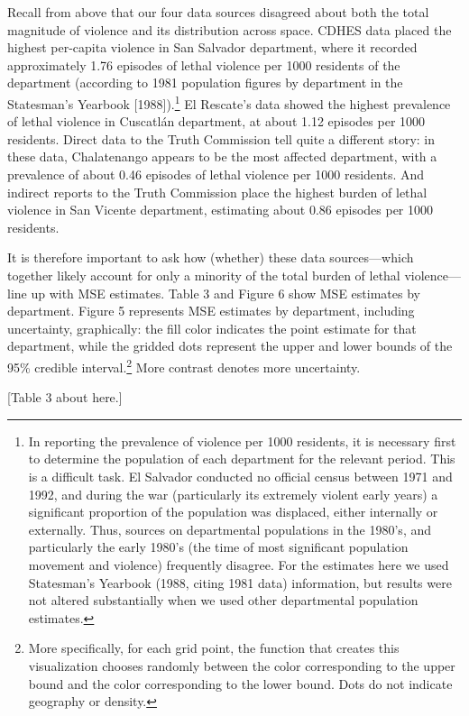 \documentclass[11pt,]{article}
\let\rmarkdownfootnote\footnote%
\def\footnote{\protect\rmarkdownfootnote}
\begin{document}
Recall from above that our four data sources disagreed about both the
total magnitude of violence and its distribution across space. CDHES
data placed the highest per-capita violence in San Salvador department,
where it recorded approximately 1.76 episodes of lethal violence per
1000 residents of the department (according to 1981 population figures
by department in the Statesman's Yearbook {[}1988{]}).\footnote{In
  reporting the prevalence of violence per 1000 residents, it is
  necessary first to determine the population of each department for the
  relevant period. This is a difficult task. El Salvador conducted no
  official census between 1971 and 1992, and during the war
  (particularly its extremely violent early years) a significant
  proportion of the population was displaced, either internally or
  externally. Thus, sources on departmental populations in the 1980's,
  and particularly the early 1980's (the time of most significant
  population movement and violence) frequently disagree. For the
  estimates here we used Statesman's Yearbook (1988, citing 1981 data)
  information, but results were not altered substantially when we used
  other departmental population estimates.} El Rescate's data showed the
highest prevalence of lethal violence in Cuscatlán department, at about
1.12 episodes per 1000 residents. Direct data to the Truth Commission
tell quite a different story: in these data, Chalatenango appears to be
the most affected department, with a prevalence of about 0.46 episodes
of lethal violence per 1000 residents. And indirect reports to the Truth
Commission place the highest burden of lethal violence in San Vicente
department, estimating about 0.86 episodes per 1000 residents.

It is therefore important to ask how (whether) these data
sources---which together likely account for only a minority of the total
burden of lethal violence---line up with MSE estimates. Table 3 and
Figure 6 show MSE estimates by department. Figure 5 represents MSE
estimates by department, including uncertainty, graphically: the fill
color indicates the point estimate for that department, while the
gridded dots represent the upper and lower bounds of the 95\% credible
interval.\footnote{More specifically, for each grid point, the function
  that creates this visualization chooses randomly between the color
  corresponding to the upper bound and the color corresponding to the
  lower bound. Dots do not indicate geography or density.} More contrast
denotes more uncertainty.

{[}Table 3 about here.{]}
\end{document}
